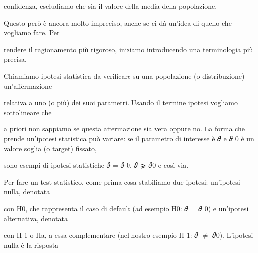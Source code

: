 \documentclass[a4paper,portrait,12pt]{article}
\begin{document}
\begin{flushleft}
confidenza, escludiamo che sia il valore della media della popolazione.
\end{flushleft}


\begin{flushleft}
Questo per\`{o} \`{e} ancora molto impreciso, anche se ci d\`{a} un'idea di quello che vogliamo fare. Per
\end{flushleft}


\begin{flushleft}
rendere il ragionamento più rigoroso, iniziamo introducendo una terminologia più precisa.
\end{flushleft}


\begin{flushleft}
Chiamiamo ipotesi statistica da verificare su una popolazione (o distribuzione) un'affermazione
\end{flushleft}


\begin{flushleft}
relativa a uno (o più) dei suoi parametri. Usando il termine ipotesi vogliamo sottolineare che
\end{flushleft}


\begin{flushleft}
a priori non sappiamo se questa affermazione sia vera oppure no. La forma che prende un'ipotesi statistica pu\`{o} variare: se il parametro di interesse \`{e} 𝜗 e 𝜗 0 \`{e} un valore soglia (o target) fissato,
\end{flushleft}


\begin{flushleft}
sono esempi di ipotesi statistiche 𝜗 = 𝜗 0, 𝜗 ⩾ 𝜗0 e così via.
\end{flushleft}





\begin{flushleft}
Per fare un test statistico, come prima cosa stabiliamo due ipotesi: un'ipotesi nulla, denotata
\end{flushleft}


\begin{flushleft}
con H0, che rappresenta il caso di default (ad esempio H0: 𝜗 = 𝜗 0) e un'ipotesi alternativa, denotata
\end{flushleft}


\begin{flushleft}
con H 1 o Ha, a essa complementare (nel nostro esempio H 1: 𝜗 $\neq$ 𝜗0). L'ipotesi nulla \`{e} la risposta
\end{flushleft}
\end{document}
